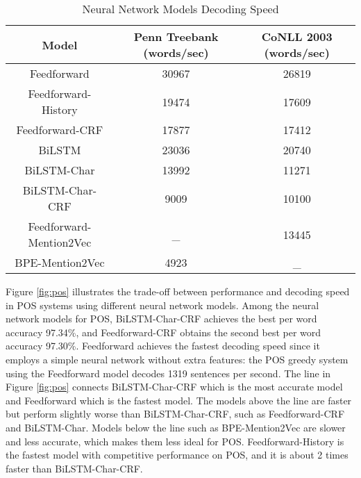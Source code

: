 \begin{table}[]
\centering
\caption{Neural Network Models Decoding Speed}
\label{table:my-label2}
\begin{tabular}{|c|c|c|}
\hline
Model & Penn Treebank (words/sec) & CoNLL 2003 (words/sec) \\ \hline
Feedforward    & 30967    & 26819    \\ \hline
Feedforward-History & 19474    & 17609     \\ \hline
Feedforward-CRF     & 17877    & 17412     \\ \hline
BiLSTM              & 23036    & 20740       \\ \hline
BiLSTM-Char         & 13992    & 11271           \\ \hline
BiLSTM-Char-CRF     & 9009     & 10100        \\ \hline
Feedforward-Mention2Vec     & _      & 13445              \\ \hline
BPE-Mention2Vec     & 4923  &  _               \\ \hline   
\end{tabular}
\end{table}

Figure \ref{fig:pos} illustrates the trade-off between performance and decoding speed in POS systems using different neural network models. Among the neural network models for POS, BiLSTM-Char-CRF achieves the best per word accuracy 97.34\%, and Feedforward-CRF obtains the second best per word accuracy 97.30\%. Feedforward achieves the fastest decoding speed since it employs a simple neural network without extra features: the POS greedy system using the Feedforward model decodes 1319 sentences per second. The line in Figure \ref{fig:pos} connects BiLSTM-Char-CRF which is the most accurate model and Feedforward which is the fastest model. The models above the line are faster but perform slightly worse than BiLSTM-Char-CRF, such as Feedforward-CRF and BiLSTM-Char. Models below the line such as BPE-Mention2Vec are slower and less accurate, which makes them less ideal for POS. Feedforward-History is the fastest model with competitive performance on POS, and it is about 2 times faster than BiLSTM-Char-CRF.

